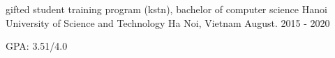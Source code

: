 


\begin{cventries}


\cventry
{gifted student training program (kstn), bachelor of computer science} %
{Hanoi University of Science and Technology} %
{Ha Noi, Vietnam} %
{August. 2015 - 2020} %
{ %
\begin{cvitems}
\item {GPA: 3.51/4.0}
\end{cvitems}
}


\end{cventries}
